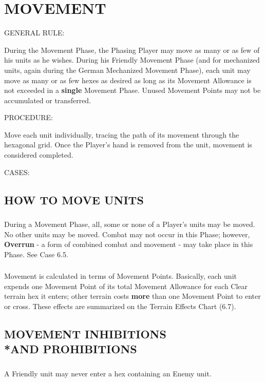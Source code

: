 \section{MOVEMENT}

GENERAL RULE:

During the Movement Phase, the Phasing Player may move as many or as few of his units as he wishes. During his Friendly Movement Phase (and for mechanized units, again during the German Mechanized Movement Phase), each unit may move as many or as few hexes as desired as long as its Movement Allowance is not exceeded in a \textbf{single} Movement Phase. Unused Movement Points may not be accumulated or transferred.

PROCEDURE:

Move each unit individually, tracing the path of its movement through the hexagonal grid. Once the Player's hand is removed from the unit, movement is considered completed.

CASES:

\subsection{HOW TO MOVE UNITS}

\subsubsection{} During a Movement Phase, all, some or none of a Player's units may be moved. No other units may be moved. Combat may not occur in this Phase; however, \textbf{Overrun} - a form of combined combat and movement - may take place in this Phase. See Case 6.5.

\subsubsection{} Movement is calculated in terms of Movement Points. Basically, each unit expends one Movement Point of its total Movement Allowance for each Clear terrain hex it enters; other terrain costs \textbf{more} than one Movement Point to enter or cross. These effects are summarized on the Terrain Effects Chart (6.7).

\subsection{MOVEMENT INHIBITIONS\\*AND PROHIBITIONS}

\subsubsection{} A Friendly unit may never enter a hex containing an Enemy unit.

